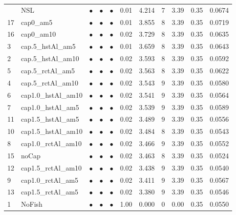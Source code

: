\documentclass[11pt]{book}
\begin{document}
\begin{landscape}
\begin{longtable}[t]{llccccccccc}
\midrule
\endhead
\
\endfoot
\bottomrule
\endlastfoot
14 & NSL & $\bullet$ & $\bullet$ & $\bullet$ & 0.01 & 4.214 & 7 & 3.39 & 0.35 & 0.0674\\
17 & cap0\_am5 & $\bullet$ & $\bullet$ & $\bullet$ & 0.01 & 3.855 & 8 & 3.39 & 0.35 & 0.0719\\
16 & cap0\_am10 & $\bullet$ & $\bullet$ & $\bullet$ & 0.02 & 3.729 & 8 & 3.39 & 0.35 & 0.0635\\
3 & cap.5\_hstAl\_am5 & $\bullet$ & $\bullet$ & $\bullet$ & 0.01 & 3.659 & 8 & 3.39 & 0.35 & 0.0643\\
2 & cap.5\_hstAl\_am10 & $\bullet$ & $\bullet$ & $\bullet$ & 0.02 & 3.593 & 8 & 3.39 & 0.35 & 0.0592\\
5 & cap.5\_rctAl\_am5 & $\bullet$ & $\bullet$ & $\bullet$ & 0.02 & 3.563 & 8 & 3.39 & 0.35 & 0.0622\\
4 & cap.5\_rctAl\_am10 & $\bullet$ & $\bullet$ & $\bullet$ & 0.02 & 3.543 & 9 & 3.39 & 0.35 & 0.0580\\
6 & cap1.0\_hstAl\_am10 & $\bullet$ & $\bullet$ & $\bullet$ & 0.02 & 3.541 & 9 & 3.39 & 0.35 & 0.0564\\
7 & cap1.0\_hstAl\_am5 & $\bullet$ & $\bullet$ & $\bullet$ & 0.02 & 3.539 & 9 & 3.39 & 0.35 & 0.0589\\
11 & cap1.5\_hstAl\_am5 & $\bullet$ & $\bullet$ & $\bullet$ & 0.02 & 3.489 & 9 & 3.39 & 0.35 & 0.0556\\
10 & cap1.5\_hstAl\_am10 & $\bullet$ & $\bullet$ & $\bullet$ & 0.02 & 3.484 & 8 & 3.39 & 0.35 & 0.0543\\
8 & cap1.0\_rctAl\_am10 & $\bullet$ & $\bullet$ & $\bullet$ & 0.02 & 3.466 & 9 & 3.39 & 0.35 & 0.0552\\
15 & noCap & $\bullet$ & $\bullet$ & $\bullet$ & 0.02 & 3.463 & 8 & 3.39 & 0.35 & 0.0524\\
12 & cap1.5\_rctAl\_am10 & $\bullet$ & $\bullet$ & $\bullet$ & 0.02 & 3.438 & 9 & 3.39 & 0.35 & 0.0540\\
9 & cap1.0\_rctAl\_am5 & $\bullet$ & $\bullet$ & $\bullet$ & 0.02 & 3.411 & 9 & 3.39 & 0.35 & 0.0567\\
13 & cap1.5\_rctAl\_am5 & $\bullet$ & $\bullet$ & $\bullet$ & 0.02 & 3.380 & 9 & 3.39 & 0.35 & 0.0546\\
1 & NoFish & $\bullet$ & $\bullet$ & $\bullet$ & 1.00 & 0.000 & 0 & 0.00 & 0.35 & 0.0550\\*
\end{longtable}
\end{landscape}
\endgroup{}
\end{document}
